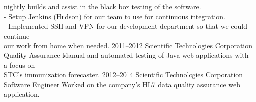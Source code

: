 \begin{entrylist}
{        nightly builds and assist in the black box testing of the software.\\
        - Setup Jenkins (Hudson) for our team to use for continuous integration.\\
        - Implemented SSH and VPN for our development department so that we could continue\\
        our work from home when needed.}
    \entry
        {2011–2012}
        {Scientific Technologies Corporation}
        {Quality Assurance}
        {Manual and automated testing of Java web applications with a focus on\\
        STC's immunization forecaster.}
    \entry
        {2012–2014}
        {Scientific Technologies Corporation}
        {Software Engineer}
        {Worked on the company's HL7 data quality assurance web application.}
\end{entrylist}
